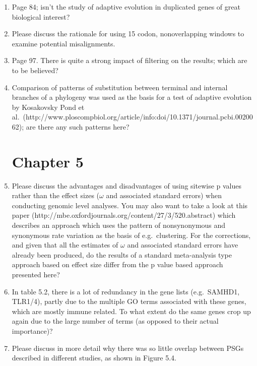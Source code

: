 \begin{enumerate}
\item{ Page 84; isn't the study of adaptive evolution in duplicated genes of
great biological interest?}

\item{ Please discuss the rationale for using 15 codon, nonoverlapping
windows to examine potential misalignments.}

\item{ Page 97. There is quite a strong impact of filtering on the results;
which are to be believed?}

\item{ Comparison of patterns of substitution between terminal and internal
branches of a phylogeny was used as the basis for a test of adaptive
evolution by Kosakovsky Pond et al.\
(http://www.ploscompbiol.org/article/info:doi/10.1371/journal.pcbi.0020062);
are there any such patterns here?}

\section{Chapter 5}

\item{ Please discuss the advantages and disadvantages of using sitewise p
values rather than the effect sizes ($\omega$ and associated standard
errors) when conducting genomic level analyses. You may also want to
take a look at this paper
(http://mbe.oxfordjournals.org/content/27/3/520.abstract) which
describes an approach which uses the pattern of nonsynonymous and
synonymous rate variation as the basis of e.g.\ clustering. For the
corrections, and given that all the estimates of $\omega$ and associated
standard errors have already been produced, do the results of a
standard meta-analysis type approach based on effect size differ from
the p value based approach presented here?}

\item{ In table 5.2, there is a lot of redundancy in the gene lists
(e.g.\ SAMHD1, TLR1/4), partly due to the multiple GO terms associated
with these genes, which are mostly immune related. To what extent do
the same genes crop up again due to the large number of terms (as
opposed to their actual importance)?}

\item{ Please discuss in more detail why there was so little overlap between
PSGs described in different studies, as shown in Figure 5.4.}


\end{enumerate}
